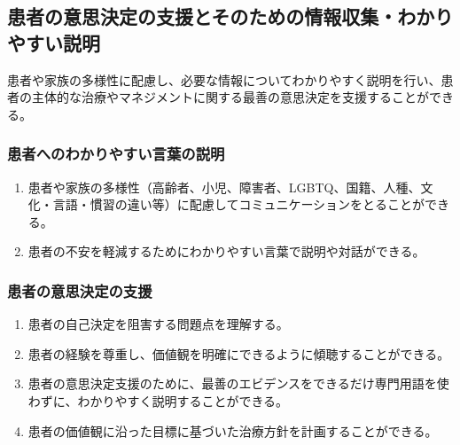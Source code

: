 \hypertarget{ux60a3ux8005ux306eux610fux601dux6c7aux5b9aux306eux652fux63f4ux3068ux305dux306eux305fux3081ux306eux60c5ux5831ux53ceux96c6ux308fux304bux308aux3084ux3059ux3044ux8aacux660e}{%
\subsection{患者の意思決定の支援とそのための情報収集・わかりやすい説明}\label{ux60a3ux8005ux306eux610fux601dux6c7aux5b9aux306eux652fux63f4ux3068ux305dux306eux305fux3081ux306eux60c5ux5831ux53ceux96c6ux308fux304bux308aux3084ux3059ux3044ux8aacux660e}}

患者や家族の多様性に配慮し、必要な情報についてわかりやすく説明を行い、患者の主体的な治療やマネジメントに関する最善の意思決定を支援することができる。

\hypertarget{ux60a3ux8005ux3078ux306eux308fux304bux308aux3084ux3059ux3044ux8a00ux8449ux306eux8aacux660e}{%
\subsubsection{患者へのわかりやすい言葉の説明}\label{ux60a3ux8005ux3078ux306eux308fux304bux308aux3084ux3059ux3044ux8a00ux8449ux306eux8aacux660e}}

\begin{enumerate}
\def\labelenumi{\arabic{enumi}.}
\tightlist
\item
  患者や家族の多様性（高齢者、小児、障害者、LGBTQ、国籍、人種、文化・言語・慣習の違い等）に配慮してコミュニケーションをとることができる。
\item
  患者の不安を軽減するためにわかりやすい言葉で説明や対話ができる。
\end{enumerate}

\hypertarget{ux60a3ux8005ux306eux610fux601dux6c7aux5b9aux306eux652fux63f4}{%
\subsubsection{患者の意思決定の支援}\label{ux60a3ux8005ux306eux610fux601dux6c7aux5b9aux306eux652fux63f4}}

\begin{enumerate}
\def\labelenumi{\arabic{enumi}.}
\tightlist
\item
  患者の自己決定を阻害する問題点を理解する。
\item
  患者の経験を尊重し、価値観を明確にできるように傾聴することができる。
\item
  患者の意思決定支援のために、最善のエビデンスをできるだけ専門用語を使わずに、わかりやすく説明することができる。
\item
  患者の価値観に沿った目標に基づいた治療方針を計画することができる。
\end{enumerate}


